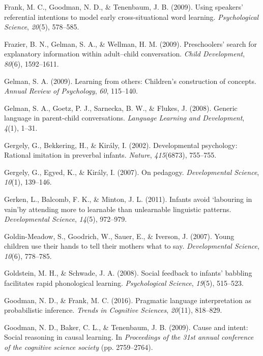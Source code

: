 \documentclass[english,floatsintext,man]{apa6}
\theoremstyle{definition}
\theoremstyle{definition}
\theoremstyle{definition}
\theoremstyle{remark}
\begin{document}
\hypertarget{ref-frank2009using}{}
Frank, M. C., Goodman, N. D., \& Tenenbaum, J. B. (2009). Using
speakers' referential intentions to model early cross-situational word
learning. \emph{Psychological Science}, \emph{20}(5), 578--585.

\hypertarget{ref-frazier2009preschoolers}{}
Frazier, B. N., Gelman, S. A., \& Wellman, H. M. (2009). Preschoolers'
search for explanatory information within adult--child conversation.
\emph{Child Development}, \emph{80}(6), 1592--1611.

\hypertarget{ref-gelman2009learning}{}
Gelman, S. A. (2009). Learning from others: Children's construction of
concepts. \emph{Annual Review of Psychology}, \emph{60}, 115--140.

\hypertarget{ref-gelman2008generic}{}
Gelman, S. A., Goetz, P. J., Sarnecka, B. W., \& Flukes, J. (2008).
Generic language in parent-child conversations. \emph{Language Learning
and Development}, \emph{4}(1), 1--31.

\hypertarget{ref-gergely2002developmental}{}
Gergely, G., Bekkering, H., \& Király, I. (2002). Developmental
psychology: Rational imitation in preverbal infants. \emph{Nature},
\emph{415}(6873), 755--755.

\hypertarget{ref-gergely2007pedagogy}{}
Gergely, G., Egyed, K., \& Király, I. (2007). On pedagogy.
\emph{Developmental Science}, \emph{10}(1), 139--146.

\hypertarget{ref-gerken2011infants}{}
Gerken, L., Balcomb, F. K., \& Minton, J. L. (2011). Infants avoid
`labouring in vain'by attending more to learnable than unlearnable
linguistic patterns. \emph{Developmental Science}, \emph{14}(5),
972--979.

\hypertarget{ref-goldin2007young}{}
Goldin-Meadow, S., Goodrich, W., Sauer, E., \& Iverson, J. (2007). Young
children use their hands to tell their mothers what to say.
\emph{Developmental Science}, \emph{10}(6), 778--785.

\hypertarget{ref-goldstein2008social}{}
Goldstein, M. H., \& Schwade, J. A. (2008). Social feedback to infants'
babbling facilitates rapid phonological learning. \emph{Psychological
Science}, \emph{19}(5), 515--523.

\hypertarget{ref-goodman2016pragmatic}{}
Goodman, N. D., \& Frank, M. C. (2016). Pragmatic language
interpretation as probabilistic inference. \emph{Trends in Cognitive
Sciences}, \emph{20}(11), 818--829.

\hypertarget{ref-goodman2009cause}{}
Goodman, N. D., Baker, C. L., \& Tenenbaum, J. B. (2009). Cause and
intent: Social reasoning in causal learning. In \emph{Proceedings of the
31st annual conference of the cognitive science society} (pp.
2759--2764).
\end{document}
